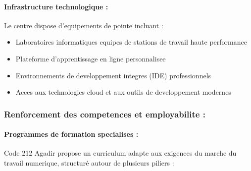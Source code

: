 \paragraph{Infrastructure technologique :}
Le centre dispose d'equipements de pointe incluant :
\begin{itemize}
    \item Laboratoires informatiques equipes de stations de travail haute performance
    \item Plateforme d'apprentissage en ligne personnalisee
    \item Environnements de developpement integres (IDE) professionnels
    \item Acces aux technologies cloud et aux outils de developpement modernes
\end{itemize}

\subsubsection{Renforcement des competences et employabilite :}

\paragraph{Programmes de formation specialises :}
Code 212 Agadir propose un curriculum adapte aux exigences du marche du travail numerique, structuré autour de plusieurs piliers :

